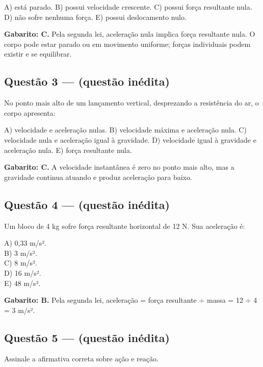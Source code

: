 \documentclass[11pt,a4paper]{article}
\begin{document}
A) está parado. B) possui velocidade crescente. C) possui força resultante nula. D) não sofre nenhuma força. E) possui deslocamento nulo.

\begin{alerta}
\textbf{Gabarito: C.} Pela segunda lei, aceleração nula implica força resultante nula. O corpo pode estar parado ou em movimento uniforme; forças individuais podem existir e se equilibrar.
\end{alerta}

\subsection*{Questão 3 — (questão inédita)}

No ponto mais alto de um lançamento vertical, desprezando a resistência do ar, o corpo apresenta:

A) velocidade e aceleração nulas. B) velocidade máxima e aceleração nula. C) velocidade nula e aceleração igual à gravidade. D) velocidade igual à gravidade e aceleração nula. E) força resultante nula.

\begin{alerta}
\textbf{Gabarito: C.} A velocidade instantânea é zero no ponto mais alto, mas a gravidade continua atuando e produz aceleração para baixo.
\end{alerta}

\subsection*{Questão 4 — (questão inédita)}

Um bloco de 4 kg sofre força resultante horizontal de 12 N. Sua aceleração é:

A) 0,33 m/s². \\ B) 3 m/s². \\ C) 8 m/s². \\ D) 16 m/s². \\ E) 48 m/s².

\begin{alerta}
\textbf{Gabarito: B.} Pela segunda lei, aceleração = força resultante ÷ massa = 12 ÷ 4 = 3 m/s².
\end{alerta}

\subsection*{Questão 5 — (questão inédita)}

Assinale a afirmativa correta sobre ação e reação.
\end{document}
